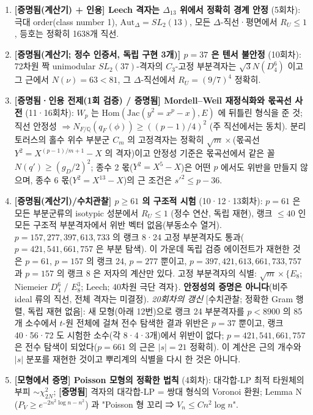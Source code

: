 \begin{enumerate}
\item
  \textbf{{[}증명됨(계산기) + 인용{]} Leech 격자는 \(\Delta_{13}\) 위에서 정확히 경계 안정} (5회차): 극대 order(class number 1), \(\mathrm{Aut}_\Delta=SL_2(13)\), 모든 \(\Delta\)-직선·평면에서 \(R_U\le1\), 등호는 정확히 1638개 직선.
\item
  \textbf{{[}증명됨(계산기; 정수 인증서, 독립 구현 3개){]} \(p=37\) 은 텐서 불안정} (10회차): 72차원 짝 unimodular \(SL_2(37)\)-격자의 \(C_3\)-고정 부분격자는 \(\sqrt3N(D_4^6)\) 이고 그 근에서 \(N(\nu)=63<81\), 그 \(\Delta\)-직선에서 \(R_U=(9/7)^4\) 정확히.
\item
  \textbf{{[}증명됨·인용 전제(1회 검증) / 증명됨{]} Mordell--Weil 재정식화와 몫곡선 사전} (11·16회차): \(W_p\) 는 \(\mathrm{Hom}(\mathrm{Jac}(y^2=x^p-x),E)\) 에 뒤틀린 형식을 준 것; 직선 안정성 \(\Rightarrow N_{F/\mathbb Q}(q_F(\phi))\ge((p-1)/4)^2\) (주 직선에서는 동치). 분리 토러스의 홀수 위수 부분군 \(C_m\) 의 고정격자는 정확히 \(\sqrt m\times\)(몫곡선 \(Y^2=X^{(p-1)/m+1}-X\) 의 격자)이고 안정성 기준은 몫곡선에서 같은 꼴 \(N(q')\ge(g_D/2)^2\); 종수 2 몫(\(Y^2=X^5-X\))은 어떤 \(p\) 에서도 위반을 만들지 않으며, 종수 6 몫(\(Y^2=X^{13}-X\))의 근 조건은 \(s'^2\le p-36\).
\item
  \textbf{{[}증명됨(계산기)/수치관찰{]} \(p\ge61\) 의 구조적 시험} (10·12·13회차): \(p=61\) 은 모든 부분군류의 isotypic 성분에서 \(R_U\le1\) (정수 연산, 독립 재현), 랭크 \(\le40\) 인 모든 구조적 부분격자에서 위반 벡터 없음(부동소수 열거). \(p=157,277,397,613,733\) 의 랭크 8·24 고정 부분격자도 통과(\(p=421,541,661,757\) 은 부분 탐색). 이 가운데 독립 검증 에이전트가 재현한 것은 \(p=61\), \(p=157\) 의 랭크 24, \(p=277\) 뿐이고, \(p=397,421,613,661,733,757\) 과 \(p=157\) 의 랭크 8 은 저자의 계산만 있다. 고정 부분격자의 식별: \(\sqrt m\times\{E_8\); Niemeier \(D_4^6\) / \(E_8^3\); Leech; 40차원 극단 격자\(\}\). \textbf{안정성의 증명은 아니다}(비주 ideal 류의 직선, 전체 격자는 미결정). \emph{20회차의 갱신} {[}수치관찰; 정확한 Gram 행렬, 독립 재현 없음{]}: 새 모형(아래 12번)으로 랭크 24 부분격자를 \(p<8900\) 의 85개 소수에서 \(t\)-원 전체에 걸쳐 전수 탐색한 결과 위반은 \(p=37\) 뿐이고, 랭크 40·56·72 도 시험한 소수(각 8·4·3개)에서 위반이 없다; \(p=421,541,661,757\) 은 전수 탐색이 되었다(\(p=661\) 의 근은 \(|s|=21\) 정확히). 이 계산은 근의 개수와 \(|s|\) 분포를 재현한 것이고 뿌리계의 식별을 다시 한 것은 아니다.
\item
  \textbf{{[}모형에서 증명{]} Poisson 모형의 정확한 법칙} (4회차): 대각합-LP 최적 타원체의 부피 \(\sim\chi^2_{2N}\); \textbf{{[}증명됨{]}} 격자의 대각합-LP = 쌍대 형식의 Voronoi 환원; Lemma N (\(P_V\ge e^{-2n^2\log n-n^2}\)) 과 "Poisson 형 꼬리 ⇒ \(V_n\le Cn^2\log n\)".

\end{enumerate}
